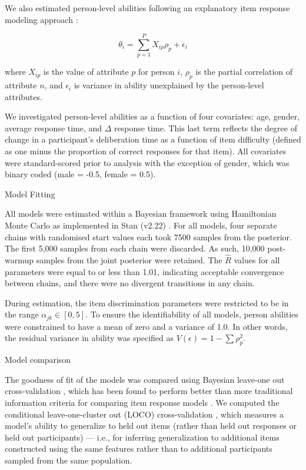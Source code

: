 \documentclass[a4paper,man,natbib]{apa6}
\makeatletter
\renewcommand{\subsubsection}{\@startsection{subsubsection}{3}
  {\z@}%
  {\b@level@two@skip}{\e@level@two@skip}%
  {\normalfont\normalsize\bfseries}}
\makeatother
\begin{document}
We also estimated person-level abilities following an explanatory item response modeling approach \citep{wilson2008explanatory}: 

\begin{equation} \label{eq:4}
\theta_i = \sum_{p=1}^P X_{ip} \rho_p + \epsilon_i    
\end{equation}

\noindent where $X_{ip}$ is the value of attribute $p$ for person $i$, $\rho_p$ is the partial correlation of attribute $n$, and $\epsilon_i$ is variance in ability unexplained by the person-level attributes. 

We investigated person-level abilities as a function of four covariates: age, gender, average response time, and $\Delta$ response time. This last term reflects the degree of change in a participant's deliberation time as a function of item difficulty (defined as one minus the proportion of correct responses for that item). All covariates were standard-scored prior to analysis with the exception of gender, which was binary coded (male = -0.5, female = 0.5).

\subsubsection{Model Fitting}

All models were estimated within a Bayesian framework using Hamiltonian Monte Carlo as implemented in Stan (v2.22) \citep{carpenter2017stan}. For all models, four separate chains with randomised start values each took 7500 samples from the posterior. The first 5,000 samples from each chain were discarded. As such, 10,000 post-warmup samples from the joint posterior were retained. The $\hat{R}$ values for all parameters were equal to or less than 1.01, indicating acceptable convergence between chains, and there were no divergent transitions in any chain. 

During estimation, the item discrimination parameters were restricted to be in the range $\alpha_{jk} \in [0, 5]$. To ensure the identifiability of all models, person abilities were constrained to have a mean of zero and a variance of 1.0. In other words, the residual variance in ability was specified as $V(\epsilon) = 1 - \sum \rho_p^2$.

\subsubsection{Model comparison}

The goodness of fit of the models was compared using Bayesian leave-one out cross-validation \citep{vehtari2017practical}, which has been found to perform better than more traditional information criteria for comparing item response models \citep{luo2017performances}. We computed the conditional leave-one-cluster out (LOCO) cross-validation \citep{merkle2019bayesian}, which measures a model's ability to generalize to held out items (rather than held out responses or held out participants) --- i.e., for inferring generalization to additional items constructed using the same features rather than to additional participants sampled from the same population.
\end{document}
